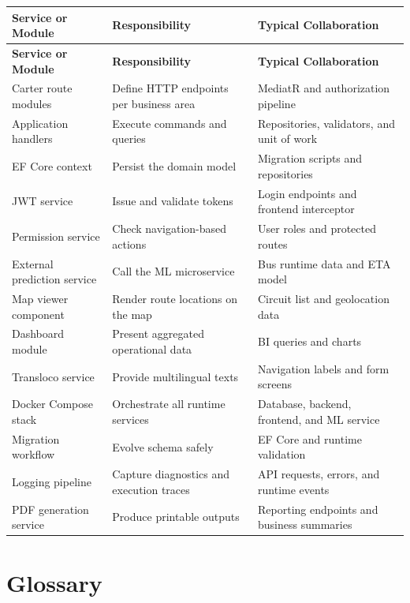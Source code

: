 \small
\begin{longtable}{p{4.2cm}p{4.6cm}p{4.6cm}}
\toprule
\textbf{Service or Module} & \textbf{Responsibility} & \textbf{Typical Collaboration} \\
\midrule
\endfirsthead
\toprule
\textbf{Service or Module} & \textbf{Responsibility} & \textbf{Typical Collaboration} \\
\midrule
\endhead
\bottomrule
\endlastfoot
Carter route modules & Define HTTP endpoints per business area & MediatR and authorization pipeline \\
Application handlers & Execute commands and queries & Repositories, validators, and unit of work \\
EF Core context & Persist the domain model & Migration scripts and repositories \\
JWT service & Issue and validate tokens & Login endpoints and frontend interceptor \\
Permission service & Check navigation-based actions & User roles and protected routes \\
External prediction service & Call the ML microservice & Bus runtime data and ETA model \\
Map viewer component & Render route locations on the map & Circuit list and geolocation data \\
Dashboard module & Present aggregated operational data & BI queries and charts \\
Transloco service & Provide multilingual texts & Navigation labels and form screens \\
Docker Compose stack & Orchestrate all runtime services & Database, backend, frontend, and ML service \\
Migration workflow & Evolve schema safely & EF Core and runtime validation \\
Logging pipeline & Capture diagnostics and execution traces & API requests, errors, and runtime events \\
PDF generation service & Produce printable outputs & Reporting endpoints and business summaries \\
\end{longtable}
\normalsize

\section{Glossary}

